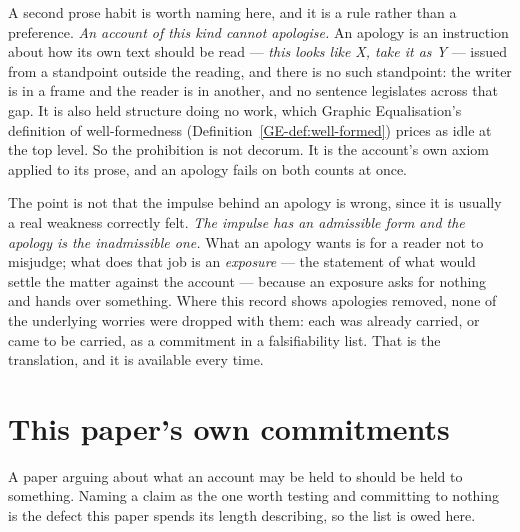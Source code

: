 \documentclass[11pt,a4paper]{article}
\begin{document}
A second prose habit is worth naming here, and it is a rule rather than a preference. \emph{An account of this kind
cannot apologise.} An apology is an instruction about how its own text should be read --- \emph{this
looks like X, take it as Y} --- issued from a standpoint outside the reading, and there is no such
standpoint: the writer is in a frame and the reader is in another, and no sentence legislates across
that gap. It is also held structure doing no work, which Graphic Equalisation's definition of
well-formedness (Definition~\ref{GE-def:well-formed}) prices as idle at the top level. So the prohibition is not decorum. It is the account's
own axiom applied to its prose, and an apology fails on both counts at once.

The point is not that the impulse behind an apology is wrong, since it is usually a real weakness
correctly felt. \emph{The impulse has an admissible form and the apology is the inadmissible one.} What
an apology wants is for a reader not to misjudge; what does that job is an \emph{exposure} --- the
statement of what would settle the matter against the account --- because an exposure asks for nothing
and hands over something. Where this record shows apologies removed, none of the underlying worries
were dropped with them: each was already carried, or came to be carried, as a commitment in a
falsifiability list. That is the translation, and it is available every time.

\section{This paper's own commitments}\label{sec:own-commitments}
A paper arguing about what an account may be held to should be held to something. Naming a claim as
the one worth testing and committing to nothing is the defect this paper spends its length
describing, so the list is owed here.
\end{document}
